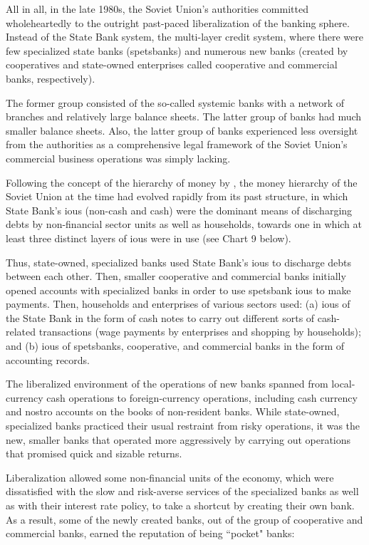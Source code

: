 All in all, in the late 1980s, the Soviet Union's authorities committed wholeheartedly to the outright past-paced liberalization of the banking sphere. Instead of the State Bank system, the multi-layer credit system, where there were few specialized state banks (spetsbanks) and numerous new banks (created by cooperatives and state-owned enterprises called cooperative and commercial banks, respectively). 

The former group consisted of the so-called systemic banks with a network of branches and relatively large balance sheets. The latter group of banks had much smaller balance sheets. Also, the latter group of banks experienced less oversight from the authorities as a comprehensive legal framework of the Soviet Union's commercial business operations was simply lacking. 

Following  the concept of the hierarchy of money by \citep{bell}, the money hierarchy of the Soviet Union at the time had evolved rapidly from its past structure, in which State Bank's \acp{iou} (non-cash and cash) were the dominant means of discharging debts by non-financial sector units as well as households, towards one in which at least three distinct layers of \acp{iou} were in use (see Chart 9 below). 

Thus, state-owned, specialized banks used State Bank's \acp{iou} to discharge debts between each other. Then, smaller cooperative and commercial banks initially opened accounts with specialized banks in order to use spetsbank \acp{iou} to make payments. Then, households and enterprises of var\acp{iou} sectors used: (a) \acp{iou} of the State Bank in the form of cash notes to carry out different sorts of cash-related transactions (wage payments by enterprises and shopping by households); and (b) \acp{iou} of spetsbanks, cooperative, and commercial banks in the form of accounting records.

The liberalized environment of the operations of new banks spanned from local-currency cash operations to foreign-currency operations, including cash currency and nostro accounts on the books of non-resident banks. While state-owned, specialized banks practiced their usual restraint from risky operations, it was the new, smaller banks that operated more aggressively by carrying out operations that promised quick and sizable returns. 

Liberalization allowed some non-financial units of the economy, which were dissatisfied with the slow and risk-averse services of the specialized banks as well as with their interest rate policy, to take a shortcut by creating their own bank. As a result, some of the newly created banks, out of the group of cooperative and commercial banks, earned the reputation of being ``pocket" banks:

